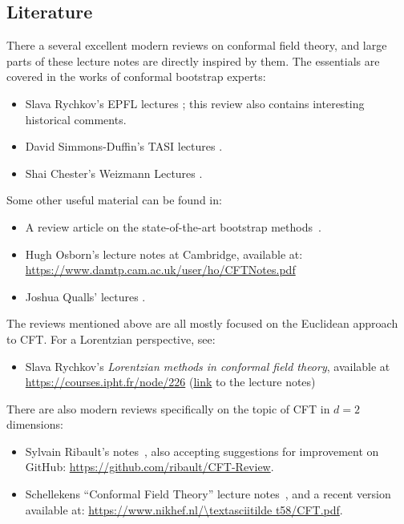 \documentclass[a4paper,12pt]{article}
\numberwithin{equation}{section}
\begin{document}
\subsection{Literature}

There a several excellent modern reviews on conformal field theory, and large parts of these lecture notes are directly inspired by them.
The essentials are covered in the works of conformal bootstrap experts:
\begin{itemize}

\item
Slava Rychkov's EPFL lectures
\cite{Rychkov:2016iqz};
this review also contains interesting historical comments.

\item
David Simmons-Duffin's TASI lectures
\cite{Simmons-Duffin:2016gjk}.

\item
Shai Chester's Weizmann Lectures
\cite{Chester:2019wfx}.

\end{itemize}
%
Some other useful material can be found in:
%
\begin{itemize}

\item
A review article on the state-of-the-art bootstrap methods~\cite{Poland:2018epd}.

\item
Hugh Osborn's lecture notes at Cambridge, available at: \\ 
\url{https://www.damtp.cam.ac.uk/user/ho/CFTNotes.pdf}

\item
Joshua Qualls' lectures \cite{Qualls:2015qjb}.

\end{itemize}
%
The reviews mentioned above are all mostly focused on the Euclidean approach to CFT. For a Lorentzian perspective, see:
\begin{itemize}

\item
Slava Rychkov's \emph{Lorentzian methods in conformal field theory}, available at \url{https://courses.ipht.fr/node/226}
(\href{https://www.ipht.fr/Docspht/articles/t19/229/public/Lecture-notes-Rychkov-IPHT.pdf}{link} to the lecture notes)

\end{itemize}
%
There are also modern reviews specifically on the topic of CFT in $d = 2$ dimensions:
\begin{itemize}

\item
Sylvain Ribault's notes~\cite{Ribault:2014hia}, 
also accepting suggestions for improvement on GitHub:
\url{https://github.com/ribault/CFT-Review}.

\item
Schellekens ``Conformal Field Theory'' lecture notes~\cite{Schellekens:1996tg}, and a recent version available at:
\url{https://www.nikhef.nl/\textasciitilde t58/CFT.pdf}.

\end{itemize}
\end{document}
